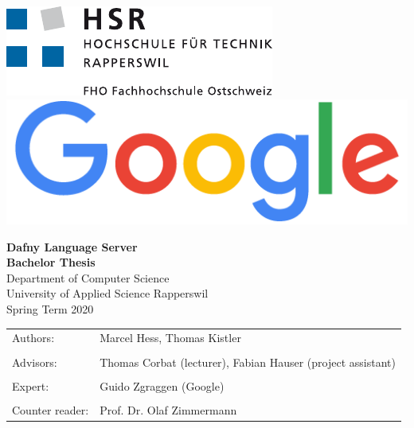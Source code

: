 \begin{titlepage}
\thispagestyle{empty}

\newcommand\thesisAuthors{Marcel Hess, Thomas Kistler}
\newcommand\thesisTitle{Dafny Language Server}
\newcommand\thesisSubject{Bachelor Thesis}
\newcommand\thesisUniversity{University of Applied Science Rapperswil}
\newcommand\thesisDepartment{Department of Computer Science}
\newcommand\thesisAdvisors{Thomas Corbat (lecturer), Fabian Hauser (project assistant)}
\newcommand\thesisExpert{Guido Zgraggen (Google)}
\newcommand\thesisPeriod{Spring Term 2020}
\newcommand\thesisReader{Prof. Dr. Olaf Zimmermann}

    \includegraphics[height=0.08\textheight]{images/logo_hsr.pdf}
    \hspace{55mm}
    \includegraphics[height=0.065\textheight]{images/logo_google.png}\\[40mm]

    \begin{center}

    	\Huge
    	\textbf{\thesisTitle} \\
    	\textbf{\thesisSubject} \\[20mm]

    	\LARGE
    	\thesisDepartment\\
    	\thesisUniversity\\[10mm]

    	\thesisPeriod \\[15mm]

    	\vfill

    \end{center}

\begin{tabularx}{\textwidth}{l X}
			\large Authors: & \large{ \thesisAuthors} \tabularnewline
			\tabularnewline
			\large Advisors: & \large{\thesisAdvisors} \tabularnewline
			\tabularnewline
			\large Expert: & \large \thesisExpert \tabularnewline
			\tabularnewline
			\large Counter reader: & \large \thesisReader
		\end{tabularx}

\end{titlepage}
